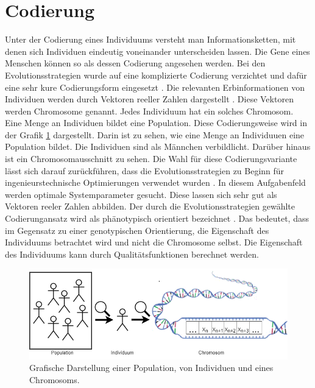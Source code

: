 \section{Codierung}
Unter der Codierung eines Individuums versteht man Informationsketten, mit denen sich Individuen eindeutig voneinander unterscheiden lassen.
Die Gene eines Menschen können so als dessen Codierung angesehen werden.
Bei den Evolutionsstrategien wurde auf eine komplizierte Codierung verzichtet und dafür eine sehr kure Codierungsform eingesetzt \cite[S.147]{schoeneburg}. Die relevanten Erbinformationen von Individuen werden durch Vektoren reeller Zahlen dargestellt \cite[S.147]{schoeneburg}. Diese Vektoren werden Chromosome genannt. Jedes Individuum hat ein solches Chromosom.
Eine Menge an Individuen bildet eine Population. Diese Codierungsweise wird in der Grafik \ref{fig:codierung} dargestellt. Darin ist zu sehen, wie eine Menge an Individuuen eine Population bildet. Die Individuen sind als Männchen verbildlicht. Darüber hinaus ist ein Chromosomausschnitt zu sehen.
Die Wahl für diese Codierungsvariante lässt sich darauf zurückführen, dass die Evolutionsstrategien zu Beginn für ingenieurstechnische Optimierungen verwendet wurden \cite[S.147]{schoeneburg}.
In diesem Aufgabenfeld werden optimale Systemparameter gesucht. Diese lassen sich sehr gut als Vektoren reeler Zahlen abbilden.
Der durch die Evolutionsstrategien gewählte Codierungansatz wird als phänotypisch orientiert bezeichnet \cite[S.148]{schoeneburg}. Das bedeutet, dass im Gegensatz zu einer genotypischen Orientierung, die Eigenschaft des Individuums betrachtet wird und nicht die Chromosome selbst.
Die Eigenschaft des Individuums kann durch Qualitätsfunktionen berechnet werden.

\begin{figure}[!htb]
	\centering
	\includegraphics[width=1.\textwidth]{img/codierung/codierung.png}
	\caption{Grafische Darstellung einer Population, von Individuen und eines Chromosoms.}
\label{fig:codierung}
\end{figure}


